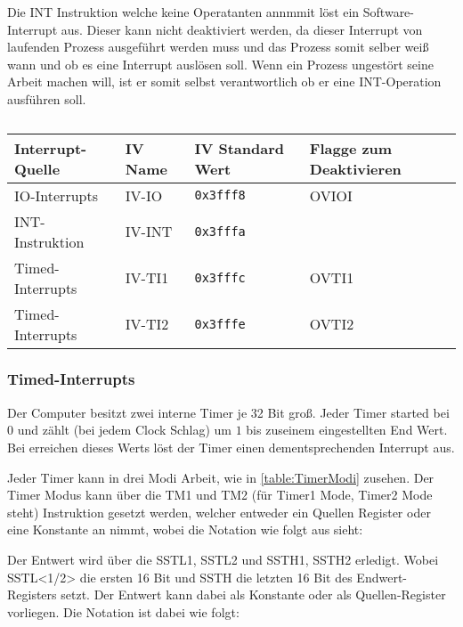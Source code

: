 \documentclass{scrartcl}
\begin{document}
Die INT Instruktion welche keine Operatanten annmmit löst ein Software-Interrupt aus. Dieser kann nicht deaktiviert werden, da dieser Interrupt von laufenden Prozess ausgeführt werden muss und das Prozess somit selber weiß wann und ob es eine Interrupt auslösen soll. Wenn ein Prozess ungestört seine Arbeit machen will, ist er somit selbst verantwortlich ob er eine INT-Operation ausführen soll. 

\begin{center}	
	\begin{table}[h]
		\caption{\label{table:iv}}
		\begin{tabular}{l | l l | l}
			Interrupt-Quelle & IV Name & IV Standard Wert & Flagge zum Deaktivieren \\
			\hline
			IO-Interrupts & IV-IO & \texttt{0x3fff8} & OVIOI \\
			INT-Instruktion & IV-INT & \texttt{0x3fffa} &  \\
			Timed-Interrupts & IV-TI1 & \texttt{0x3fffc} & OVTI1 \\
			Timed-Interrupts & IV-TI2 & \texttt{0x3fffe} & OVTI2
		\end{tabular}
	\end{table}
\end{center}

\subsubsection{Timed-Interrupts}

Der Computer besitzt zwei interne Timer je 32 Bit groß. Jeder Timer started bei $0$ und zählt (bei jedem Clock Schlag) um $1$ bis zuseinem eingestellten End Wert. Bei erreichen dieses Werts löst der Timer einen dementsprechenden Interrupt aus. 

Jeder Timer kann in drei Modi Arbeit, wie in \autoref{table:TimerModi} zusehen. Der Timer Modus kann über die TM1 und TM2 (für Timer1 Mode, Timer2 Mode steht) Instruktion gesetzt werden, welcher entweder ein Quellen Register oder eine Konstante an nimmt, wobei die Notation wie folgt aus sieht:


Der Entwert wird über die SSTL1, SSTL2 und SSTH1, SSTH2 erledigt. Wobei SSTL<1/2> die ersten 16 Bit und SSTH die letzten 16 Bit des Endwert-Registers setzt. Der Entwert kann dabei als Konstante oder als Quellen-Register vorliegen. Die Notation ist dabei wie folgt:

\end{document}
